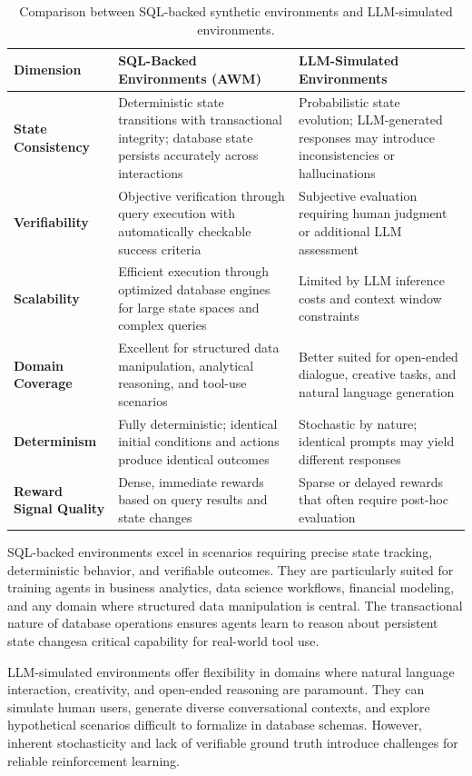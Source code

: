 \begin{table}[htbp]
\centering
\footnotesize
\begin{tabularx}{\textwidth}{YYY}
\toprule
\textbf{Dimension} & \textbf{SQL-Backed Environments (AWM)} & \textbf{LLM-Simulated Environments} \\
\midrule
\textbf{State Consistency} & Deterministic state transitions with transactional integrity; database state persists accurately across interactions & Probabilistic state evolution; LLM-generated responses may introduce inconsistencies or hallucinations \\
\textbf{Verifiability} & Objective verification through query execution with automatically checkable success criteria & Subjective evaluation requiring human judgment or additional LLM assessment \\
\textbf{Scalability} & Efficient execution through optimized database engines for large state spaces and complex queries & Limited by LLM inference costs and context window constraints \\
\textbf{Domain Coverage} & Excellent for structured data manipulation, analytical reasoning, and tool-use scenarios & Better suited for open-ended dialogue, creative tasks, and natural language generation \\
\textbf{Determinism} & Fully deterministic; identical initial conditions and actions produce identical outcomes & Stochastic by nature; identical prompts may yield different responses \\
\textbf{Reward Signal Quality} & Dense, immediate rewards based on query results and state changes & Sparse or delayed rewards that often require post-hoc evaluation \\
\bottomrule
\end{tabularx}
\caption{Comparison between SQL-backed synthetic environments and LLM-simulated environments.}
\label{tbl:synthetic-environment-tradeoffs}
\end{table}

SQL-backed environments excel in scenarios requiring precise state tracking, deterministic behavior, and verifiable outcomes. They are particularly suited for training agents in business analytics, data science workflows, financial modeling, and any domain where structured data manipulation is central. The transactional nature of database operations ensures agents learn to reason about persistent state changesa critical capability for real-world tool use.

LLM-simulated environments offer flexibility in domains where natural language interaction, creativity, and open-ended reasoning are paramount. They can simulate human users, generate diverse conversational contexts, and explore hypothetical scenarios difficult to formalize in database schemas. However, inherent stochasticity and lack of verifiable ground truth introduce challenges for reliable reinforcement learning.

